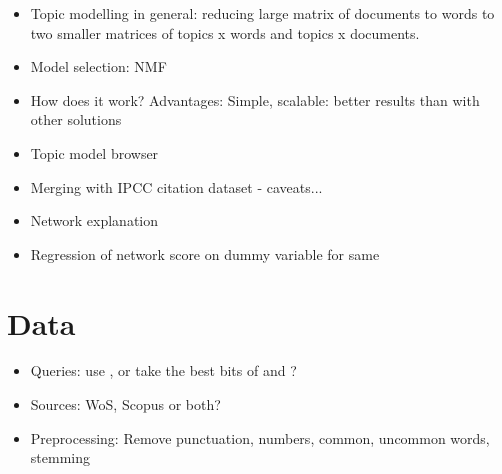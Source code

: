\documentclass{article}
\begin{document}
\begin{itemize}
\item Topic modelling in general: reducing large matrix of documents to words to two smaller matrices of topics x words and topics x documents.
\item Model selection: NMF \citep{Lee1999}
\item How does it work? Advantages: Simple, scalable: better results than with other solutions%
\item Topic model browser \citet{Chaney2012}
\item Merging with IPCC citation dataset - caveats...
\item Network explanation
\item Regression of network score on dummy variable for same

\end{itemize}

\section{Data}
\begin{itemize}
	\item Queries: use \citet{Grieneisen2011}, or take the best bits of \citet{Grieneisen2011} and \citet{Haunschild2016}?
    \item Sources: WoS, Scopus or both?
    \item Preprocessing: Remove punctuation, numbers, common, uncommon words, stemming
\end{itemize}





\listoffigures
\linespread{1}


\end{document}
